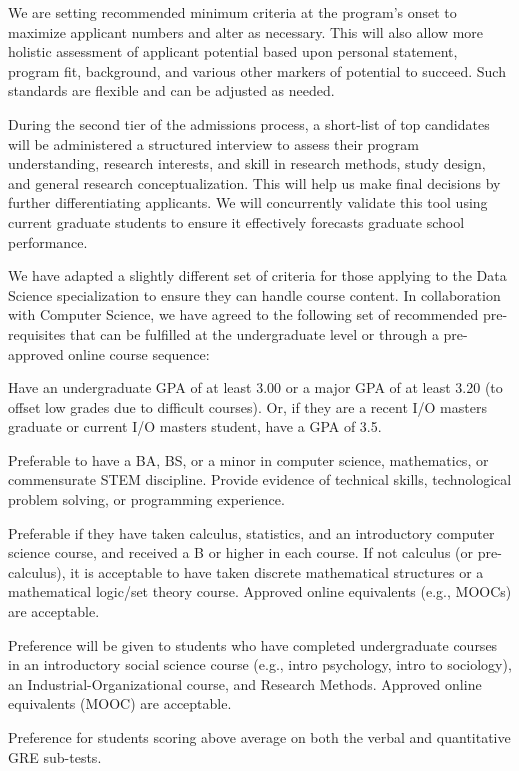 \documentclass[
]{book}
\begin{document}
We are setting recommended minimum criteria at the program's onset to maximize applicant numbers and alter as necessary. This will also allow more holistic assessment of applicant potential based upon personal statement, program fit, background, and various other markers of potential to succeed. Such standards are flexible and can be adjusted as needed.

During the second tier of the admissions process, a short-list of top candidates will be administered a structured interview to assess their program understanding, research interests, and skill in research methods, study design, and general research conceptualization. This will help us make final decisions by further differentiating applicants. We will concurrently validate this tool using current graduate students to ensure it effectively forecasts graduate school performance.

We have adapted a slightly different set of criteria for those applying to the Data Science specialization to ensure they can handle course content. In collaboration with Computer Science, we have agreed to the following set of recommended pre-requisites that can be fulfilled at the undergraduate level or through a pre-approved online course sequence:

Have an undergraduate GPA of at least 3.00 or a major GPA of at least 3.20 (to offset low grades due to difficult courses). Or, if they are a recent I/O masters graduate or current I/O masters student, have a GPA of 3.5.

Preferable to have a BA, BS, or a minor in computer science, mathematics, or commensurate STEM discipline. Provide evidence of technical skills, technological problem solving, or programming experience.

Preferable if they have taken calculus, statistics, and an introductory computer science course, and received a B or higher in each course. If not calculus (or pre-calculus), it is acceptable to have taken discrete mathematical structures or a mathematical logic/set theory course. Approved online equivalents (e.g., MOOCs) are acceptable.

Preference will be given to students who have completed undergraduate courses in an introductory social science course (e.g., intro psychology, intro to sociology), an Industrial-Organizational course, and Research Methods. Approved online equivalents (MOOC) are acceptable.

Preference for students scoring above average on both the verbal and quantitative GRE sub-tests.
\end{document}

